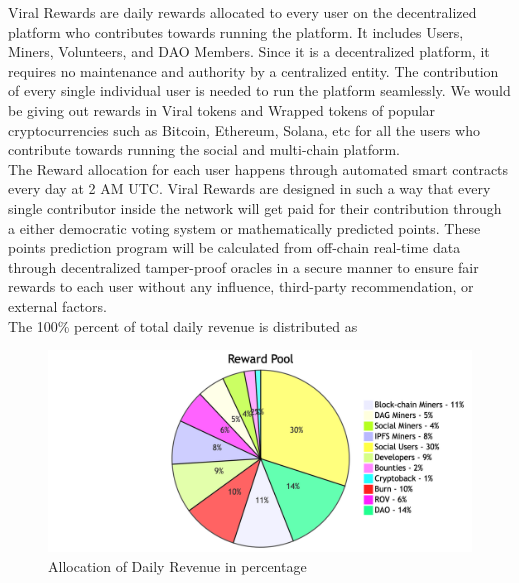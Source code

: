 \documentclass[10pt]{article}
\begin{document}
Viral Rewards are daily rewards allocated to every user on the decentralized platform who contributes towards running the platform. It includes Users, Miners, Volunteers, and DAO Members. Since it is a decentralized platform, it requires no maintenance and authority by a centralized entity. The contribution of every single individual user is needed to run the platform seamlessly. We would be giving out rewards in Viral tokens and Wrapped tokens of popular cryptocurrencies such as Bitcoin, Ethereum, Solana, etc for all the users who contribute towards running the social and multi-chain platform.\\

The Reward allocation for each user happens through automated smart contracts every day at 2 AM UTC. Viral Rewards are designed in such a way that every single contributor inside the network will get paid for their contribution through a either democratic voting system or mathematically predicted points. These points prediction program will be calculated from off-chain real-time data through decentralized tamper-proof oracles in a secure  manner to ensure fair rewards to each user without any influence, third-party recommendation, or external factors. \\

The 100\% percent of total daily revenue is distributed as \\
\begin{figure}[H]
\begin{center}
\includegraphics[width=14cm]{global-reward}
\caption{Allocation of Daily Revenue in percentage}
\end{center}
\end{figure}
\end{document}
